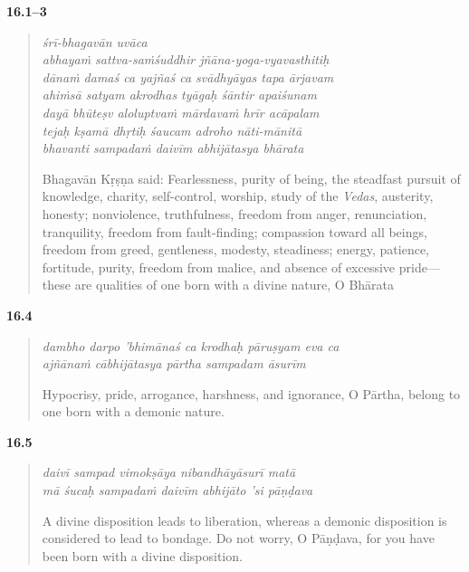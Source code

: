 \par\noindent\textbf{16.1–3}\par
\begin{verse}
\textit{śrī-bhagavān uvāca} \\
\textit{abhayaṁ sattva-saṁśuddhir jñāna-yoga-vyavasthitiḥ} \\
\textit{dānaṁ damaś ca yajñaś ca svādhyāyas tapa ārjavam} \\
\textit{ahiṁsā satyam akrodhas tyāgaḥ śāntir apaiśunam} \\
\textit{dayā bhūteṣv aloluptvaṁ mārdavaṁ hrīr acāpalam} \\
\textit{tejaḥ kṣamā dhṛtiḥ śaucam adroho nāti-mānitā} \\
\textit{bhavanti sampadaṁ daivīm abhijātasya bhārata}

\noindent Bhagavān Kṛṣṇa said: Fearlessness, purity of being, the steadfast pursuit of knowledge, charity, self-control, worship, study of the \textit{Vedas}, austerity, honesty; nonviolence, truthfulness, freedom from anger, renunciation, tranquility, freedom from fault-finding; compassion toward all beings, freedom from greed, gentleness, modesty, steadiness; energy, patience, fortitude, purity, freedom from malice, and absence of excessive pride---these are qualities of one born with a divine nature, O Bhārata
\end{verse}
\par



\par\noindent\textbf{16.4}\par
\begin{verse}
\textit{dambho darpo ’bhimānaś ca krodhaḥ pāruṣyam eva ca} \\
\textit{ajñānaṁ cābhijātasya pārtha sampadam āsurīm}

\noindent Hypocrisy, pride, arrogance, harshness, and ignorance, O Pārtha, belong to one born with a demonic nature.
\end{verse}
\par



\par\noindent\textbf{16.5}\par
\begin{verse}
\textit{daivī sampad vimokṣāya nibandhāyāsurī matā} \\
\textit{mā śucaḥ sampadaṁ daivīm abhijāto ’si pāṇḍava}

\noindent A divine disposition leads to liberation, whereas a demonic disposition is considered to lead to bondage. Do not worry, O Pāṇḍava, for you have been born with a divine disposition.
\end{verse}
\par



